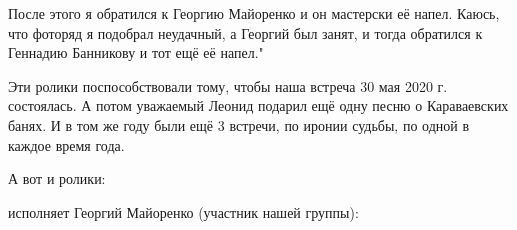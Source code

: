 После этого я обратился к Георгию Майоренко и он мастерски её напел. Каюсь, что
фоторяд я подобрал неудачный, а Георгий был занят, и тогда обратился к Геннадию
Банникову и тот ещё её напел."

Эти ролики поспособствовали тому, чтобы наша встреча 30 мая 2020 г. состоялась.
А потом уважаемый Леонид подарил ещё одну песню о Караваевских банях. И в том
же году были ещё 3 встречи, по иронии судьбы, по одной в каждое время года.

А вот и ролики:

исполняет Георгий Майоренко (участник нашей группы):
